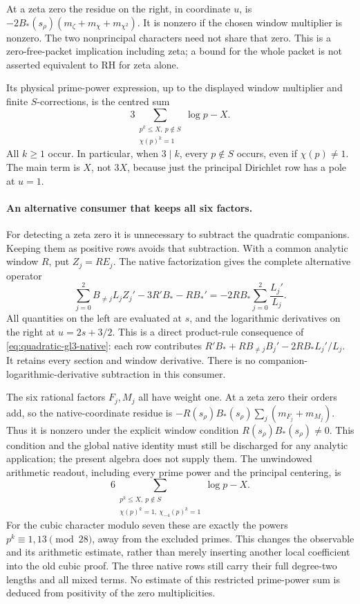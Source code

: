 At a zeta zero the residue on the right, in coordinate \(u\), is
\(-2B_*(s_\rho)(m_\zeta+m_\chi+m_{\chi^2})\).
It is nonzero if the chosen window multiplier is nonzero.
The two nonprincipal characters need not share that zero.
This is a zero-free-packet implication including zeta; a bound for
the whole packet is not asserted equivalent to RH for zeta alone.

Its physical prime-power expression, up to the displayed window
multiplier and finite \(S\)-corrections, is the centred sum
\[
 3\sum_{\substack{p^k\le X,\ p\notin S\\\chi(p)^k=1}}
           \log p-X.
\]
All \(k\ge1\) occur. In particular, when \(3\mid k\), every
\(p\notin S\) occurs, even if \(\chi(p)\ne1\).
The main term is \(X\), not \(3X\), because just the principal
Dirichlet row has a pole at \(u=1\).

\paragraph{An alternative consumer that keeps all six factors.}
For detecting a zeta zero it is unnecessary to subtract the quadratic
companions. Keeping them as positive rows avoids that subtraction.
With a common analytic window \(R\), put \(Z_j=RE_j\). The native
factorization gives the complete alternative operator
\begin{equation}\label{eq:quadratic-positive-six-packet}
 \sum_{j=0}^2 B_{\ne j}L_j Z_j'
       -3R'B_*-RB_*'
   =-2RB_*\sum_{j=0}^2\frac{L_j'}{L_j}.
\end{equation}
All quantities on the left are evaluated at \(s\), and the
logarithmic derivatives on the right at \(u=2s+3/2\).
This is a direct product-rule consequence of
\eqref{eq:quadratic-gl3-native}: each row contributes
\(R'B_*+RB_{\ne j}B_j'-2RB_*L_j'/L_j\).
It retains every section and window derivative. There is no
companion-logarithmic-derivative subtraction in this consumer.

The six rational factors \(F_j,M_j\) all have weight one.
At a zeta zero their orders add, so the native-coordinate residue
is \(-R(s_\rho)B_*(s_\rho)\sum_j(m_{F_j}+m_{M_j})\).
Thus it is nonzero under the explicit window condition
\(R(s_\rho)B_*(s_\rho)\ne0\). This condition and the global native
identity must still be discharged for any analytic application;
the present algebra does not supply them. The unwindowed arithmetic
readout, including every prime power and the principal centering, is
\[
 6\!\!\sum_{\substack{p^k\le X,\ p\notin S\\
             \chi(p)^k=1,\ \chi_{-4}(p)^k=1}}\log p-X.
\]
For the cubic character modulo seven these are exactly the powers
\(p^k\equiv1,13\pmod{28}\), away from the excluded primes.
This changes the observable and its arithmetic estimate, rather than
merely inserting another local coefficient into the old cubic proof.
The three native rows still carry their full degree-two lengths and
all mixed terms. No estimate of this restricted prime-power sum is
deduced from positivity of the zero multiplicities.

